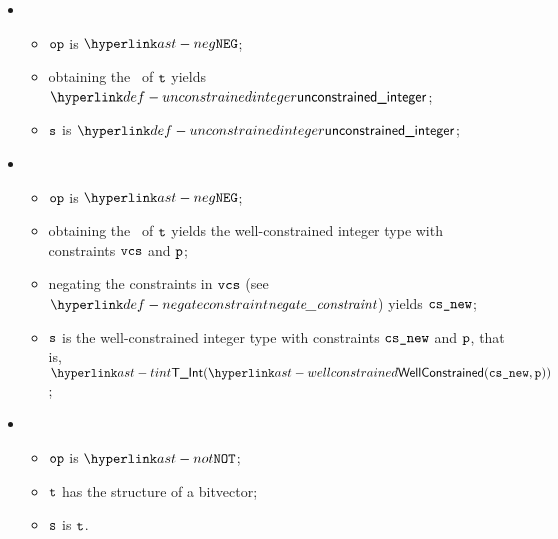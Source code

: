 \begin{itemize}
\item {}
\begin{itemize}
  \item $\op$ is $\NEG$;
  \item obtaining the \wellconstrainedstructure\ of $\vt$ yields $\unconstrainedinteger$\ProseOrTypeError;
  \item $\vs$ is $\unconstrainedinteger$;
\end{itemize}

\item {}
\begin{itemize}
  \item $\op$ is $\NEG$;
  \item obtaining the \wellconstrainedstructure\ of $\vt$ yields the well-constrained integer type with constraints $\vcs$ and \Proseprecisionlossindicator{} $\vp$\ProseOrTypeError;
  \item negating the constraints in $\vcs$ (see $\negateconstraint$) yields $\vcsnew$;
  \item $\vs$ is the well-constrained integer type with constraints $\vcsnew$ and \Proseprecisionlossindicator{} $\vp$, that is, \\
  $\TInt(\wellconstrained(\vcsnew, \vp))$;
\end{itemize}

\item {}
  \begin{itemize}
  \item $\op$ is $\NOT$;
  \item $\vt$ has the structure of a bitvector;
  \item $\vs$ is $\vt$.
  \end{itemize}
\end{itemize}

\FormallyParagraph
\begin{mathpar}
\end{mathpar}

\begin{mathpar}
\end{mathpar}

